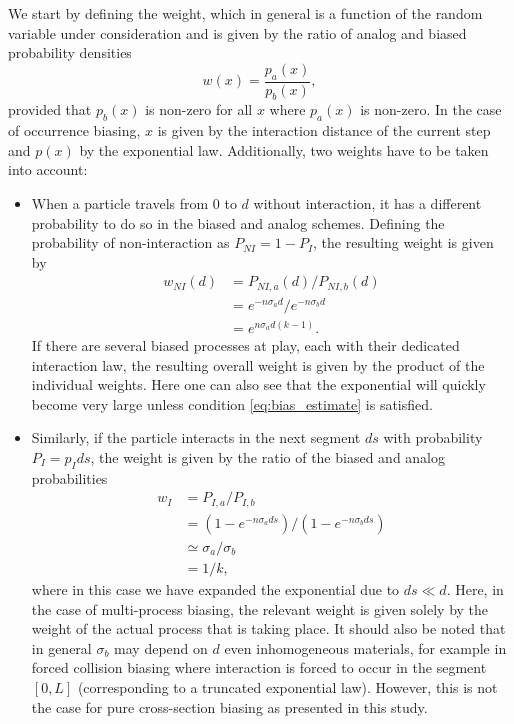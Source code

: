We start by defining the weight, which in general is a function of the random variable under consideration and is given by the ratio of analog and biased probability densities
%
\begin{equation} \label{eq:weight}
w(x) = \frac{p_a(x)}{p_b(x)},
\end{equation}
%
provided that $p_b(x)$ is non-zero for all $x$ where $p_a(x)$ is non-zero. In the case of occurrence biasing, $x$ is given by the interaction distance of the current step and $p(x)$ by the exponential law. Additionally, two weights have to be taken into account:
%
\begin{itemize}
    \item When a particle travels from 0 to $d$ without interaction, it has a different probability to do so in the biased and analog schemes. Defining the probability of non-interaction as $P_{NI} = 1 - P_{I}$, the resulting weight is given by
    \begin{equation} \label{eq:weight_NI}
    \begin{split}
    w_{NI}(d) &= P_{NI,a}(d)/P_{NI,b}(d)\\
    &=e^{-n\sigma_a d}/e^{-n\sigma_b d}\\
    &= e^{n\sigma_a d(k-1)}.
    \end{split}
    \end{equation}
    If there are several biased processes at play, each with their dedicated interaction law, the resulting overall weight is given by the product of the individual weights. Here one can also see that the exponential will quickly become very large unless condition \ref{eq:bias_estimate} is satisfied.
    \item Similarly, if the particle interacts in the next segment $ds$ with probability $P_I = p_I ds$, the weight is given by the ratio of the biased and analog probabilities
    \begin{equation} \label{eq:weight_I}
    \begin{split}
    w_{I} &= P_{I,a}/P_{I,b}\\
    &=(1-e^{-n\sigma_a ds})/(1-e^{-n\sigma_b ds})\\
    &\simeq \sigma_a / \sigma_b\\
    &= 1/k,
    \end{split}
    \end{equation}
    where in this case we have expanded the exponential due to $ds \ll d$. Here, in the case of multi-process biasing, the relevant weight is given solely by the weight of the actual process that is taking place. It should also be noted that in general $\sigma_b$ may depend on $d$ even inhomogeneous materials, for example in forced collision biasing where interaction is forced to occur in the segment $[0,L]$ (corresponding to a truncated exponential law). However, this is not the case for pure cross-section biasing as presented in this study.
\end{itemize}
